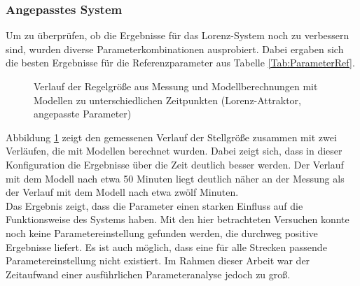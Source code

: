             \subsubsection{Angepasstes System}
                Um zu überprüfen, ob die Ergebnisse für das Lorenz-System noch zu verbessern sind, wurden diverse Parameterkombinationen ausprobiert. Dabei ergaben sich die besten Ergebnisse
                für die Referenzparameter aus Tabelle \ref{Tab:ParameterRef}.   
                \begin{figure}[h]
                    \caption{Verlauf der Regelgröße aus Messung und Modellberechnungen mit Modellen zu unterschiedlichen Zeitpunkten (Lorenz-Attraktor, angepasste Parameter)}
                    \label{Abb:Modelle11}
                \end{figure}
                Abbildung \ref{Abb:Modelle11} zeigt den gemessenen Verlauf der Stellgröße zusammen mit zwei Verläufen, die mit Modellen berechnet wurden. Dabei zeigt sich, dass in 
                dieser Konfiguration die Ergebnisse über die Zeit deutlich besser werden. Der Verlauf mit dem Modell nach etwa 50 Minuten liegt deutlich näher an der Messung als 
                der Verlauf mit dem Modell nach etwa zwölf Minuten.\\
                Das Ergebnis zeigt, dass die Parameter einen starken Einfluss auf die Funktionsweise des Systems haben. Mit den hier betrachteten Versuchen konnte 
                noch keine Parametereinstellung gefunden werden, die durchweg positive Ergebnisse liefert. Es ist auch möglich, dass eine für alle Strecken passende 
                Parametereinstellung nicht existiert. Im Rahmen dieser Arbeit war der Zeitaufwand einer ausführlichen Parameteranalyse jedoch zu groß.   
            